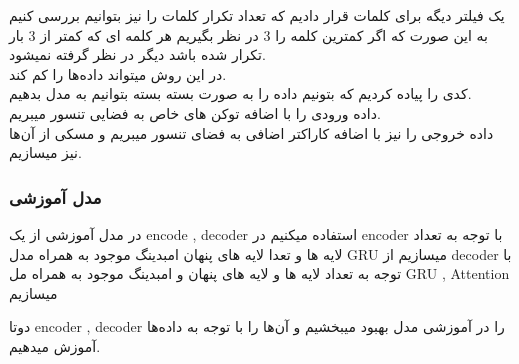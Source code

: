 یک فیلتر دیگه برای کلمات قرار دادیم که تعداد تکرار کلمات را نیز بتوانیم بررسی کنیم به این صورت که اگر کمترین کلمه را 3 در نظر بگیریم
هر کلمه ای که کمتر از 3 بار تکرار شده باشد دیگر در نظر گرفته نمیشود.\\
در این روش میتواند داده‌ها را کم کند.\\

کدی را پیاده کردیم که بتونیم داده را به صورت بسته بسته بتوانیم به مدل بدهیم.\\
داده ورودی را با اضافه توکن های خاص به فضایی تنسور میبریم.\\
داده خروجی را نیز با اضافه کاراکتر اضافی به فضای تنسور میبریم و مسکی از آن‌ها نیز میسازیم.\\

\subsubsection{مدل آموزشی}
در مدل آموزشی از یک encode , decoder استفاده میکنیم
در encoder با توجه به تعداد لایه ها و تعدا لایه های پنهان امبدینگ موجود به همراه مدل GRU میسازیم
از decoder با توجه به تعداد لایه ها و لایه های پنهان و امبدینگ موجود به همراه مل GRU , Attention میسازیم

دوتا encoder , decoder را در آموزشی مدل بهبود میبخشیم و آن‌ها را با توجه به داده‌ها آموزش میدهیم.
